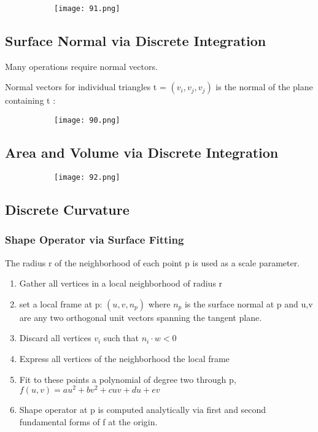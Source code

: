 \documentclass{article}
\begin{document}
    \begin{figure}[ht!]
  \centering
  \begin{subfigure}[b]{0.7\linewidth}
    \texttt{[image: 91.png]}
  \end{subfigure}
\end{figure}

\subsection{Surface Normal via Discrete Integration}

Many operations require normal vectors.

Normal vectors for individual triangles t = $(v_i,v_j,v_j)$ is the normal of the plane containing t :

    \begin{figure}[ht!]
  \centering
  \begin{subfigure}[b]{0.7\linewidth}
    \texttt{[image: 90.png]}
  \end{subfigure}
\end{figure}

\subsection{Area and Volume via Discrete Integration}

    \begin{figure}[ht!]
  \centering
  \begin{subfigure}[b]{0.7\linewidth}
    \texttt{[image: 92.png]}
  \end{subfigure}
\end{figure}

\subsection{Discrete Curvature}

\subsubsection{Shape Operator via Surface Fitting}

The radius r of the neighborhood of each point p is used as a scale parameter.

\begin{enumerate}
    \item Gather all vertices in a local neighborhood of radius r
    \item  set a local frame at p: $(u,v,n_p)$ where $n_p$ is the surface normal at p and u,v are any two orthogonal unit vectors spanning the tangent plane.
    \item Discard all vertices $v_i$ such that $n_i \cdot w < 0$
    \item Express all vertices of the neighborhood the local frame
    \item Fit to these points a polynomial of degree two through p, $f(u,v) = au^2 + bv^2 + cuv + du + ev$
    \item Shape operator at p is computed analytically via first and second fundamental forms of f at the origin.
\end{enumerate}
\end{document}

